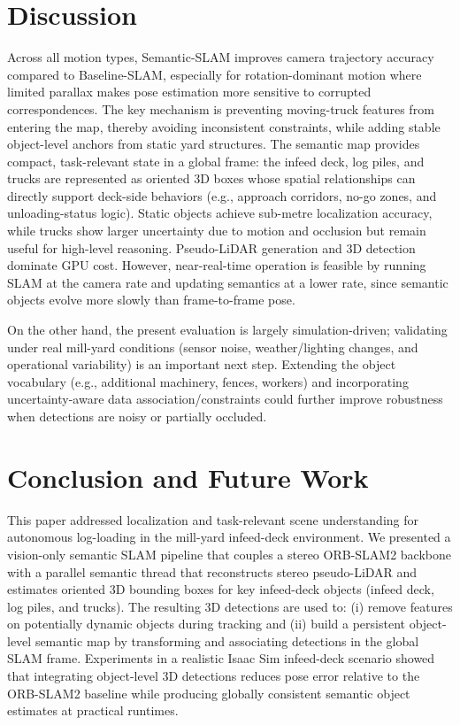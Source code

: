 \documentclass[letterpaper, 10 pt, conference]{IEEEtran}  %
\begin{document}
\section{Discussion}
\label{sec:discussion}
Across all motion types, Semantic-SLAM improves camera trajectory accuracy compared to Baseline-SLAM, especially for rotation-dominant motion where limited parallax makes pose estimation more sensitive to corrupted correspondences. The key mechanism is preventing moving-truck features from entering the map, thereby avoiding inconsistent constraints, while adding stable object-level anchors from static yard structures. The semantic map provides compact, task-relevant state in a global frame: the infeed deck, log piles, and trucks are represented as oriented 3D boxes whose spatial relationships can directly support deck-side behaviors (e.g., approach corridors, no-go zones, and unloading-status logic). Static objects achieve sub-metre localization accuracy, while trucks show larger uncertainty due to motion and occlusion but remain useful for high-level reasoning. Pseudo-LiDAR generation and 3D detection dominate GPU cost. However, near-real-time operation is feasible by running SLAM at the camera rate and updating semantics at a lower rate, since semantic objects evolve more slowly than frame-to-frame pose.

On the other hand, the present evaluation is largely simulation-driven; validating under real mill-yard conditions (sensor noise, weather/lighting changes, and operational variability) is an important next step. Extending the object vocabulary (e.g., additional machinery, fences, workers) and incorporating uncertainty-aware data association/constraints could further improve robustness when detections are noisy or partially occluded.


\section{Conclusion and Future Work}
\label{sec:conclusion}

This paper addressed localization and task-relevant scene understanding for autonomous log-loading in the mill-yard infeed-deck environment. We presented a vision-only semantic SLAM pipeline that couples a stereo ORB-SLAM2 backbone with a parallel semantic thread that reconstructs stereo pseudo-LiDAR and estimates oriented 3D bounding boxes for key infeed-deck objects (infeed deck, log piles, and trucks). The resulting 3D detections are used to: (i) remove features on potentially dynamic objects during tracking and (ii) build a persistent object-level semantic map by transforming and associating detections in the global SLAM frame. Experiments in a realistic Isaac Sim infeed-deck scenario showed that integrating object-level 3D detections reduces pose error relative to the ORB-SLAM2 baseline while producing globally consistent semantic object estimates at practical runtimes.
\end{document}
